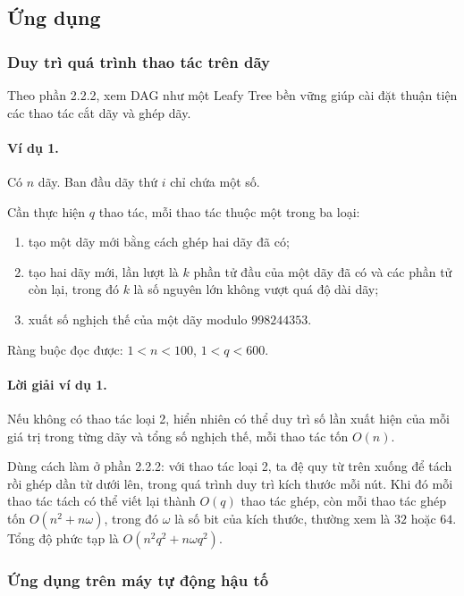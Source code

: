 \documentclass[11pt]{article}
\begin{document}
\subsection{Ứng dụng}

\subsubsection{Duy trì quá trình thao tác trên dãy}

Theo phần 2.2.2, xem DAG như một Leafy Tree bền vững giúp cài đặt thuận tiện
các thao tác cắt dãy và ghép dãy.

\paragraph{Ví dụ 1.}
Có $n$ dãy. Ban đầu dãy thứ $i$ chỉ chứa một số.

Cần thực hiện $q$ thao tác, mỗi thao tác thuộc một trong ba loại:
\begin{enumerate}
  \item tạo một dãy mới bằng cách ghép hai dãy đã có;
  \item tạo hai dãy mới, lần lượt là $k$ phần tử đầu của một dãy đã có và các
  phần tử còn lại, trong đó $k$ là số nguyên lớn không vượt quá độ dài dãy;
  \item xuất số nghịch thế của một dãy modulo $998244353$.
\end{enumerate}

Ràng buộc đọc được: $1<n<100$, $1<q<600$.

\paragraph{Lời giải ví dụ 1.}
Nếu không có thao tác loại 2, hiển nhiên có thể duy trì số lần xuất hiện của mỗi
giá trị trong từng dãy và tổng số nghịch thế, mỗi thao tác tốn $O(n)$.

Dùng cách làm ở phần 2.2.2: với thao tác loại 2, ta đệ quy từ trên xuống để tách
rồi ghép dần từ dưới lên, trong quá trình duy trì kích thước mỗi nút. Khi đó mỗi
thao tác tách có thể viết lại thành $O(q)$ thao tác ghép, còn mỗi thao tác ghép
tốn $O(n^2+n\omega)$, trong đó $\omega$ là số bit của kích thước, thường xem là
$32$ hoặc $64$. Tổng độ phức tạp là $O(n^2q^2+n\omega q^2)$.

\subsubsection{Ứng dụng trên máy tự động hậu tố}
\end{document}
